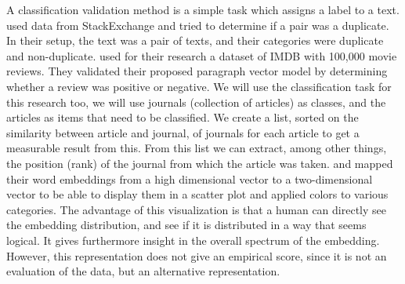 \documentclass[../../Thesis.tex]{subfiles}
\begin{document}
\begin{jumpin}
A classification validation method is a simple task which assigns a label to a text. \citet{lau2016empirical} used data from StackExchange and tried to determine if a pair was a duplicate. In their setup, the text was a pair of texts, and their categories were duplicate and non-duplicate. \citet{le2014distributed} used for their research a dataset of IMDB with 100,000 movie reviews. They validated their proposed paragraph vector model by determining whether a review was positive or negative. We will use the classification task for this research too, we will use journals (collection of articles) as classes, and the articles as items that need to be classified. We create a list, sorted on the similarity between article and journal, of journals for each article to get a measurable result from this. From this list we can extract, among other things, the position (rank) of the journal from which the article was taken.
\citet{dai2015document} and \citet{hinton2003stochastic} mapped their word embeddings from a high dimensional vector to a two-dimensional vector to be able to display them in a scatter plot and applied colors to various categories. The advantage of this visualization is that a human can directly see the embedding distribution, and see if it is distributed in a way that seems logical. It gives furthermore insight in the overall spectrum of the embedding. However, this representation does not give an empirical score, since it is not an evaluation of the data, but an alternative representation. 
\end{jumpin}
\clearpage
{}
\end{document}
